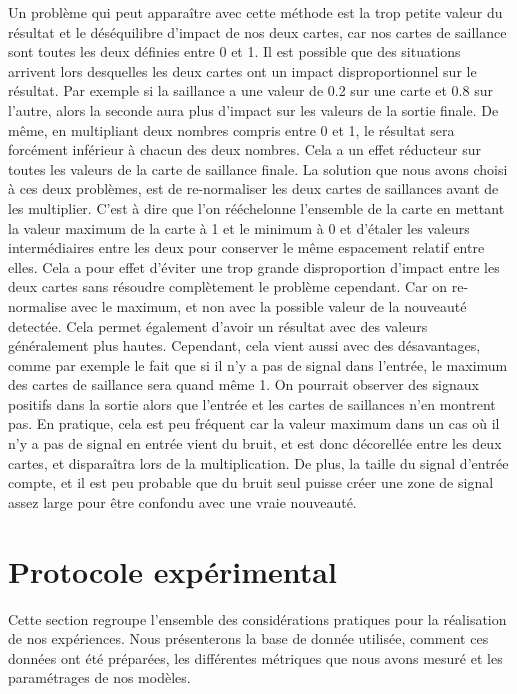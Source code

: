	Un problème qui peut apparaître avec cette méthode est la trop petite valeur du résultat et le déséquilibre d'impact de nos deux cartes, car nos cartes de saillance sont toutes les deux définies entre 0 et 1. Il est possible que des situations arrivent lors desquelles les deux cartes ont un impact disproportionnel sur le résultat. Par exemple si la saillance a une valeur de 0.2 sur une carte et 0.8 sur l'autre, alors la seconde aura plus d'impact sur les valeurs de la sortie finale. De même, en multipliant deux nombres compris entre 0 et 1, le résultat sera forcément inférieur à chacun des deux nombres. Cela a un effet réducteur sur toutes les valeurs de la carte de saillance finale. La solution que nous avons choisi à ces deux problèmes, est de re-normaliser les deux cartes de saillances avant de les multiplier. C'est à dire que l'on rééchelonne l'ensemble de la carte en mettant la valeur maximum de la carte à 1 et le minimum à 0 et d'étaler les valeurs intermédiaires entre les deux pour conserver le même espacement relatif entre elles. Cela a pour effet d'éviter une trop grande disproportion d'impact entre les deux cartes sans résoudre complètement le problème cependant. Car on re-normalise avec le maximum, et non avec la possible valeur de la nouveauté detectée. Cela permet également d'avoir un résultat avec des valeurs généralement plus hautes. Cependant, cela vient aussi avec des désavantages, comme par exemple le fait que si il n'y a pas de signal dans l'entrée, le maximum des cartes de saillance sera quand même 1. On pourrait observer des signaux positifs dans la sortie alors que l'entrée et les cartes de saillances n'en montrent pas. En pratique, cela est peu fréquent car la valeur maximum dans un cas où il n'y a pas de signal en entrée vient du bruit, et est donc décorellée entre les deux cartes, et disparaîtra lors de la multiplication. De plus, la taille du signal d'entrée compte, et il est peu probable que du bruit seul puisse créer une zone de signal assez large pour être confondu avec une vraie nouveauté.

	\newpage
	\section{Protocole expérimental}

	Cette section regroupe l'ensemble des considérations pratiques pour la réalisation de nos expériences. Nous présenterons la base de donnée utilisée, comment ces données ont été préparées, les différentes métriques que nous avons mesuré et les paramétrages de nos modèles.


